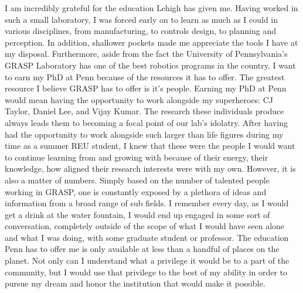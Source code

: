 \documentclass{article}
\begin{document}
I am incredibly grateful for the education Lehigh has given me. Having worked
in such a small laboratory, I was forced early on to learn as much as I could
in various disciplines, from manufacturing, to controls design, to planning and
perception. In addition, shallower pockets made me appreciate the tools I have
at my disposal. Furthermore, aside from the fact the University of
Pennsylvania’s GRASP Laboratory has one of the best robotics programs in the
country, I want to earn my PhD at Penn because of the resources it has to
offer. The greatest resource I believe GRASP has to offer is it's people.
Earning my PhD at Penn would mean having the opportunity to work alongside my
superheroes: CJ Taylor, Daniel Lee, and Vijay Kumar. The research these
individuals produce always leads them to becoming a focal point of our lab's
idolatry. After having had the opportunity to work alongside such larger than
life figures during my time as a summer REU student, I knew that these were the
people I would want to continue learning from and growing with because of their
energy, their knowledge, how aligned their research interests were with my own.
However, it is also a matter of numbers. Simply based on the number of talented
people working in GRASP, one is constantly exposed by a plethora of ideas and
information from a broad range of sub fields.  I remember every day, as I would
get a drink at the water fountain,  I would end up engaged in some sort of
conversation, completely outside of the scope of what I would have seen alone
and what I was doing, with some graduate student or professor. The education
Penn has to offer me is only available at less than a handful of places on the
planet. Not only can I understand what a privilege it would be to a part of the
community, but I would use that privilege to the best of my ability in order to
pursue my dream and honor the institution that would make it possible.
\end{document}
